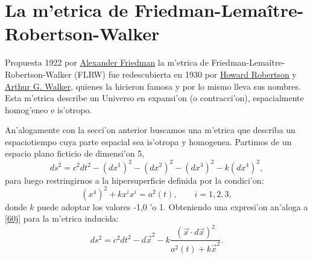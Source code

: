 \section{La m'etrica de Friedman-Lema\^itre-Robertson-Walker}
Propuesta 1922 por \href{http://es.wikipedia.org/wiki/Aleksandr_Fridman}{Alexander Friedman} la m'etrica de Friedman-Lema\^itre-Robertson-Walker (FLRW) fue redescubierta en 1930 por \href{http://en.wikipedia.org/wiki/Howard_P._Robertson}{Howard Robertson} y \href{http://en.wikipedia.org/wiki/Arthur_Geoffrey_Walker}{Arthur G. Walker}, quienes la hicieron famosa y por lo mismo lleva sus nombres. Esta m'etrica describe un Universo en expansi'on (o contracci'on), espacialmente homog'eneo e is'otropo.

An'alogamente con la secci'on anterior buscamos una m'etrica que describa un espaciotiempo cuya parte espacial sea is'otropa y homogenea. Partimos de un espacio plano ficticio de dimensi'on 5,
\begin{equation}
 ds^{2}= c^2dt^2 -(dx^{1})^{2}-(dx^{2})^{2}-(dx^{3})^{2}-k(dx^{4})^{2},
 \end{equation}
para luego restringirnos a la hipersuperficie definida por la condici'on:
 \begin{equation}\label{60k}
(x^{4})^{2} +kx^{i}x^{i}=a^{2}(t),\qquad i=1,2,3, 
  \end{equation}
donde $k$ puede adoptar los valores -1,0 'o 1. Obteniendo una expresi'on an'aloga a \eqref{60j} para la m'etrica inducida:
\begin{equation}\label{60kk}
ds^{2}= c^2dt^2 - d\vec{x}^{2} - k\frac{(\vec{x}\cdot d\vec{x})^{2}}{a^{2}(t)+k\vec{x}^{2}}. 
\end{equation}

